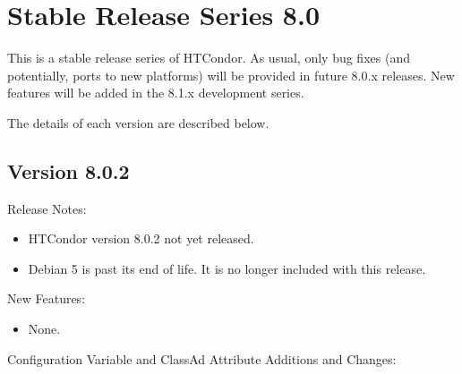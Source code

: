
\section{\label{sec:History-8-0}Stable Release Series 8.0}

This is a stable release series of HTCondor.
As usual, only bug fixes (and potentially, ports to new platforms)
will be provided in future 8.0.x releases.
New features will be added in the 8.1.x development series.

The details of each version are described below.

\subsection*{\label{sec:New-8-0-2}Version 8.0.2}

\noindent Release Notes:

\begin{itemize}

\item HTCondor version 8.0.2 not yet released.

\item Debian 5 is past its end of life. 
It is no longer included with this release.

\end{itemize}


\noindent New Features:

\begin{itemize}

\item None.

\end{itemize}

\noindent Configuration Variable and ClassAd Attribute Additions and Changes:

